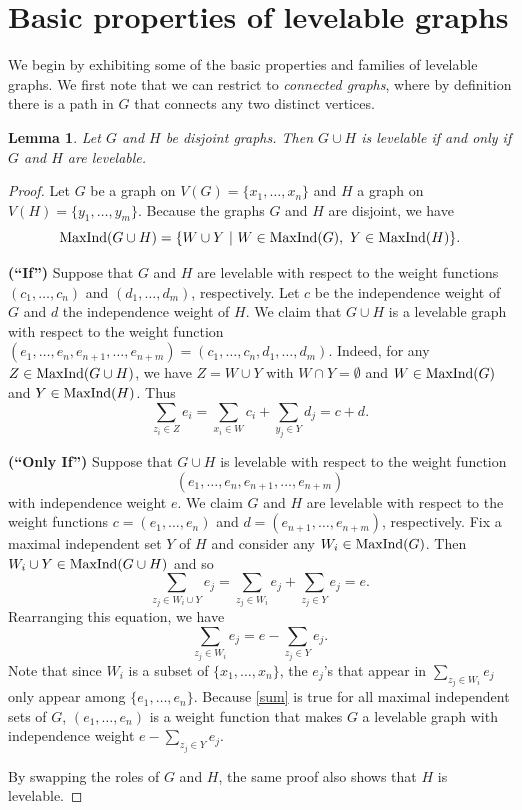 \documentclass[12pt]{amsart}
\numberwithin{equation}{section}
\newtheorem{lemma}[theorem]{Lemma}
\theoremstyle{definition}
\newcounter{i} %
\begin{document}

\section{Basic properties of levelable graphs}

We begin by exhibiting some of the basic properties and families
of levelable graphs.  We first note that we can
restrict
to {\it connected graphs}, where by definition there is a path in $G$ that connects any two distinct
vertices.

\begin{lemma}\label{lemma.connected}
Let $G$ and $H$ be disjoint graphs.  Then $G \cup H$ is levelable if
and only if $G$ and $H$ are levelable.
\end{lemma}

\begin{proof}
Let $G$ be a graph 
on $V(G) = \{x_1,\ldots,x_n\}$ and
$H$ a graph on $V(H) = \{y_1,\ldots,y_m\}$.  
Because the graphs $G$ and $H$ are 
disjoint, we have
\[{\rm MaxInd}(G \cup H) = \{W \cup Y ~|~ W \in {\rm MaxInd}(G),~ 
Y \in {\rm MaxInd}(H)\}.\]

{\bf (``If'')} 
Suppose that $G$ and $H$ are levelable with respect to 
the weight functions $(c_1,\ldots,c_n)$ and 
$(d_1,\ldots,d_m)$, respectively.
Let $c$ be the independence weight of $G$ and $d$ the 
independence weight of $H$.
We claim that $G \cup H$ is a levelable graph
with respect to the weight function
$(e_1,\ldots,e_n,e_{n+1},\ldots,e_{n+m}) = (c_1,\ldots,c_n,d_1,\ldots,d_m)$.
Indeed, for any $Z \in {\rm MaxInd}(G \cup H)$,
we have $Z = W \cup Y$ with $W \cap Y = \emptyset$ and
$W \in {\rm MaxInd}(G)$ and $Y \in {\rm MaxInd}(H)$. Thus
\[\sum_{z_i \in Z} e_i = \sum_{x_i \in W} c_i + \sum_{y_j \in Y} d_j =
c+d.\]

{\bf (``Only If'')} 
Suppose that 
$G \cup H$ is levelable with respect to
the weight function \[(e_1,\ldots,e_n,e_{n+1},\ldots,e_{n+m})\]
with independence weight $e$.
We claim $G$ and $H$ are levelable with respect
to the weight functions
$c = (e_1,\ldots,e_n)$ and 
$d = (e_{n+1},\ldots,e_{n+m})$, respectively.  Fix a
maximal independent set $Y$ of $H$ and consider any
$W_i \in {\rm MaxInd}(G)$.  
Then $W_i \cup Y \in {\rm MaxInd}(G \cup H)$ and so
\[\sum_{z_j \in W_i \cup Y} e_j = \sum_{z_j \in W_i} e_j + 
\sum_{z_j \in Y} e_j = e.\]
Rearranging this equation, we have 
\begin{equation}\label{sum}
\sum_{z_j \in W_i}e_j = e - \sum_{z_j \in Y} e_j.
\end{equation}
Note that since $W_i$ is a subset of $\{x_1,\ldots,x_n\}$, the 
$e_j$'s that appear in $\sum_{z_j \in W_i}e_j$ only appear among
$\{e_1,\ldots,e_n\}$.  Because \eqref{sum} is true for 
all maximal independent sets of $G$, $(e_1,\ldots,e_n)$ is a
weight function that makes $G$ a levelable  
graph with independence weight $e - \sum_{z_j \in Y} e_j$.  

By swapping the roles of $G$ and $H$, the same proof also shows
that $H$ is levelable.
\end{proof}
\end{document}
